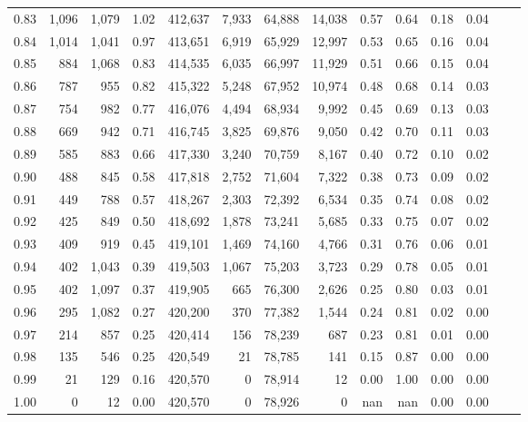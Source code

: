 \begin{tabular}{rrrrrrrrrrrrrr}
0.83 &  1,096 &  1,079 &    1.02 &  412,637 &    7,933 &  64,888 &  14,038 &  0.57 &  0.64 &  0.18 &      0.04 \\
0.84 &  1,014 &  1,041 &    0.97 &  413,651 &    6,919 &  65,929 &  12,997 &  0.53 &  0.65 &  0.16 &      0.04 \\
0.85 &    884 &  1,068 &    0.83 &  414,535 &    6,035 &  66,997 &  11,929 &  0.51 &  0.66 &  0.15 &      0.04 \\
0.86 &    787 &    955 &    0.82 &  415,322 &    5,248 &  67,952 &  10,974 &  0.48 &  0.68 &  0.14 &      0.03 \\
0.87 &    754 &    982 &    0.77 &  416,076 &    4,494 &  68,934 &   9,992 &  0.45 &  0.69 &  0.13 &      0.03 \\
0.88 &    669 &    942 &    0.71 &  416,745 &    3,825 &  69,876 &   9,050 &  0.42 &  0.70 &  0.11 &      0.03 \\
0.89 &    585 &    883 &    0.66 &  417,330 &    3,240 &  70,759 &   8,167 &  0.40 &  0.72 &  0.10 &      0.02 \\
0.90 &    488 &    845 &    0.58 &  417,818 &    2,752 &  71,604 &   7,322 &  0.38 &  0.73 &  0.09 &      0.02 \\
0.91 &    449 &    788 &    0.57 &  418,267 &    2,303 &  72,392 &   6,534 &  0.35 &  0.74 &  0.08 &      0.02 \\
0.92 &    425 &    849 &    0.50 &  418,692 &    1,878 &  73,241 &   5,685 &  0.33 &  0.75 &  0.07 &      0.02 \\
0.93 &    409 &    919 &    0.45 &  419,101 &    1,469 &  74,160 &   4,766 &  0.31 &  0.76 &  0.06 &      0.01 \\
0.94 &    402 &  1,043 &    0.39 &  419,503 &    1,067 &  75,203 &   3,723 &  0.29 &  0.78 &  0.05 &      0.01 \\
0.95 &    402 &  1,097 &    0.37 &  419,905 &      665 &  76,300 &   2,626 &  0.25 &  0.80 &  0.03 &      0.01 \\
0.96 &    295 &  1,082 &    0.27 &  420,200 &      370 &  77,382 &   1,544 &  0.24 &  0.81 &  0.02 &      0.00 \\
0.97 &    214 &    857 &    0.25 &  420,414 &      156 &  78,239 &     687 &  0.23 &  0.81 &  0.01 &      0.00 \\
0.98 &    135 &    546 &    0.25 &  420,549 &       21 &  78,785 &     141 &  0.15 &  0.87 &  0.00 &      0.00 \\
0.99 &     21 &    129 &    0.16 &  420,570 &        0 &  78,914 &      12 &  0.00 &  1.00 &  0.00 &      0.00 \\
1.00 &      0 &     12 &    0.00 &  420,570 &        0 &  78,926 &       0 &   nan &   nan &  0.00 &      0.00 \\
\bottomrule
\end{tabular}

